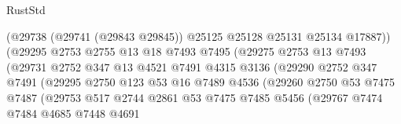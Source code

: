 \begin{lexlean}{RustStd}
\begin{coremodule}
                                  (@29738
                                    (@29741 (@29843 @29845))
                                    @25125
                                    @25128
                                    @25131
                                    @25134
                                    @17887))
                                (@29295
                                  @2753
                                  @2755
                                  @13
                                  @18
                                  @7493
                                  @7495
                                  (@29275
                                    @2753
                                    @13
                                    @7493
                                    (@29731
                                      @2752
                                      @347
                                      @13
                                      @4521
                                      @7491
                                      @4315
                                      @3136
                                      (@29290
                                        @2752
                                        @347
                                        @7491
                                        (@29295
                                          @2750
                                          @123
                                          @53
                                          @16
                                          @7489
                                          @4536
                                          (@29260
                                            @2750
                                            @53
                                            @7475
                                            @7487
                                            (@29753
                                              @517
                                              @2744
                                              @2861
                                              @53
                                              @7475
                                              @7485
                                              @5456
                                              (@29767
                                                @7474
                                                @7484
                                                @4685
                                                @7448
                                                @4691

\end{coremodule}
\end{lexlean}
